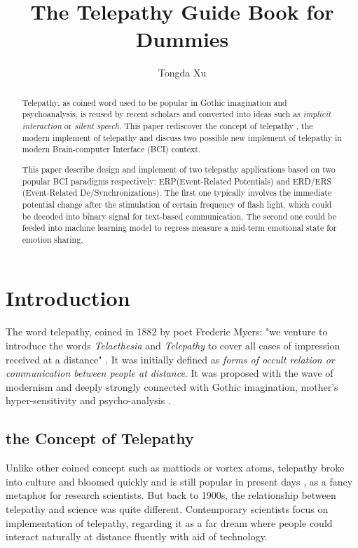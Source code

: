 \documentclass[a4paper]{article}
\begin{document}
\title{The Telepathy Guide Book for Dummies}
\author{Tongda Xu}
\maketitle

\begin{abstract}

Telepathy, as coined word used to be popular in Gothic imagination and psychoanalysis, is reused by recent scholars and converted into ideas such as \textit{implicit interaction} or \textit{silent speech}. This paper rediscover the concept of telepathy , the modern implement of telepathy and discuss two possible new implement of telepathy in modern Brain-computer Interface (BCI) context.

This paper describe design and implement of two telepathy applications based on two popular BCI paradigms respectively: ERP(Event-Related Potentials) and ERD/ERS (Event-Related De/Synchronizations). The first one typically involves the immediate potential change after the stimulation of certain frequency of flash light, which could be decoded into binary signal for text-based communication. The second one could be feeded into machine learning model to regress measure a mid-term emotional state for emotion sharing.  
\end{abstract}

\section{Introduction}

The word telepathy, coined in 1882 by poet Frederic Myers: "we venture to introduce the words \textit{Telaethesia} and \textit{Telepathy} to cover all cases of impression received at a distance" \autocite{luckhurst2002invention}. It was initially defined as \textit {forms of occult relation or communication between people at distance}. \autocite{luckhurst2002invention} It was proposed with the wave of modernism and deeply  strongly connected with Gothic imagination, mother's hyper-sensitivity and psycho-analysis \autocite{freud1955dreams}.

\subsection{the Concept of Telepathy}

Unlike other coined concept such as mattiods or vortex atoms, telepathy broke into culture and bloomed quickly and is still popular in present days \autocite{luckhurst2002invention}, as a fancy metaphor for research scientists. But back to 1900s, the relationship between telepathy and science was quite different. Contemporary scientists focus on implementation of telepathy, regarding it as a far dream where people could interact naturally at distance fluently with aid of technology. 
\end{document}
